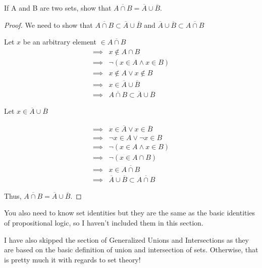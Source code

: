\begin{question}
    If A and B are two sets, show that $\overline{A \cap B} = \overline{A} \cup
    \overline{B}$.
\end{question}

\begin{proof}
    We need to show that $\overline{A \cap B} \subset \overline{A} \cup
    \overline{B}$ and $\overline{A} \cup \overline{B} \subset \overline{A \cap
    B}$

    Let $x$ be an arbitrary element $\in \overline{A \cap B}$
    \[
        \begin{split}
            \implies &x \not\in A \cap B \\
            \implies &\neg(x \in A \wedge x \in B) \\
            \implies &x \not\in A \vee x \not\in B \\
            \implies &x \in \overline{A} \cup \overline{B} \\
            \implies &\overline{A \cap B} \subset \overline{A} \cup \overline{B}
        \end{split}
    \]

    Let $x \in \overline{A} \cup \overline{B}$

    \[
        \begin{split}
            \implies &x \in \overline{A} \vee x \in \overline{B} \\
            \implies &\neg x \in A \vee \neg x \in B \\
            \implies &\neg (x \in A \wedge x \in B) \\
            \implies &\neg (x \in A \cap B) \\
            \implies &x \in \overline{A \cap B} \\
            \implies &\overline{A} \cup \overline{B} \subset \overline{A \cap B}
        \end{split}
    \]

    Thus, $\overline{A \cap B} = \overline{A} \cup \overline{B}$.
\end{proof}

You also need to know set identities but they are the same as the basic
identities of propositional logic, so I haven't included them in this section.

I have also skipped the section of Generalized Unions and Intersections as they
are based on the basic definition of union and intersection of sets. Otherwise,
that is pretty much it with regards to set theory!
